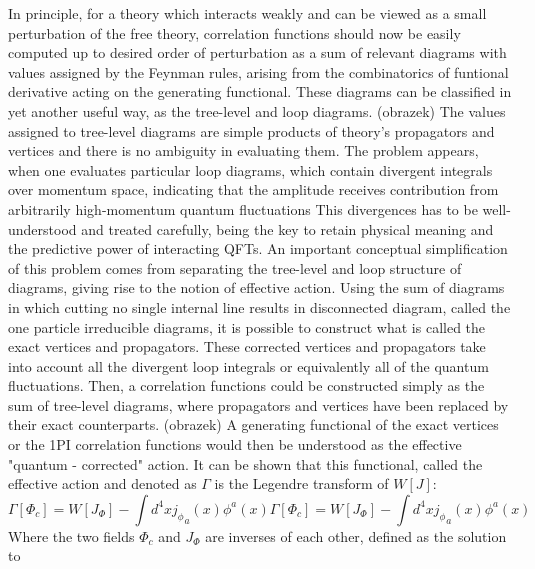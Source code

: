 \documentclass[11pt, a4paper]{article}
\begin{document}
In principle, for a theory which interacts weakly and can be viewed as a small perturbation of the free theory, correlation functions should now be easily computed up to desired order of perturbation as a sum of relevant diagrams with values assigned by the Feynman rules, arising from the combinatorics of funtional derivative acting on the generating functional.
These diagrams can be classified in yet another useful way,
as the tree-level and loop diagrams.
(obrazek)
The values assigned to tree-level diagrams are simple products of theory's propagators and vertices and there is no ambiguity in evaluating them.
The problem appears, when one evaluates particular loop diagrams, which contain divergent integrals over momentum space, indicating that the amplitude receives contribution from arbitrarily high-momentum quantum fluctuations
This divergences has to be well-understood and treated carefully, being the key to retain physical meaning and the predictive power of interacting QFTs.
An important conceptual simplification of this problem comes from separating the tree-level and loop structure of diagrams, giving rise to the notion of effective action.
Using the sum of diagrams in which cutting no single internal line results in disconnected diagram, called the one particle irreducible diagrams, it is possible to construct what is called the exact vertices and propagators.
These corrected vertices and propagators take into account all the divergent loop integrals or equivalently all of the quantum fluctuations.
Then, a correlation functions could be constructed simply as the sum of tree-level diagrams, where propagators and vertices have been replaced by their exact counterparts.
(obrazek)
A generating functional of the exact vertices or the 1PI correlation functions would then be understood as the effective "quantum - corrected" action.
It can be shown that this functional, called the effective action and denoted as $\Gamma$ is the Legendre transform of $W[J]$:
\begin{equation}
    \Gamma[\Phi_c] = W[J_\Phi] - \int d^4 x {j_\phi}_a(x) \phi^a(x)
    \Gamma[\Phi_c] = W[J_\Phi] - \int d^4 x {j_\phi}_a(x) \phi^a(x)
\end{equation}
Where the two fields $\Phi_c$ and $J_\Phi$ are inverses of each other, defined as the solution to
\end{document}

